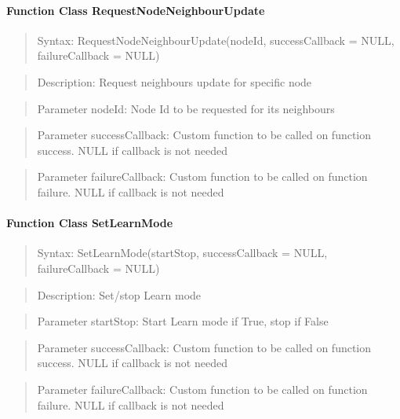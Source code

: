 \paragraph {Function Class RequestNodeNeighbourUpdate}
\begin{quote} Syntax: RequestNodeNeighbourUpdate(nodeId, successCallback = NULL, failureCallback = NULL)\end{quote}
\begin{quote} Description: Request neighbours update for specific node\end{quote}
\begin{quote} Parameter nodeId: Node Id to be requested for its neighbours\end{quote}
\begin{quote} Parameter successCallback: Custom function to be called on function success. NULL if callback is not needed\end{quote} 
\begin{quote} Parameter failureCallback: Custom function to be called on function failure. NULL if callback is not needed\end{quote} 

\paragraph {Function Class SetLearnMode}
\begin{quote} Syntax: SetLearnMode(startStop, successCallback = NULL, failureCallback = NULL)\end{quote}
\begin{quote} Description: Set/stop Learn mode\end{quote}
\begin{quote} Parameter startStop: Start Learn mode if True, stop if False\end{quote}
\begin{quote} Parameter successCallback: Custom function to be called on function success. NULL if callback is not needed\end{quote} 
\begin{quote} Parameter failureCallback: Custom function to be called on function failure. NULL if callback is not needed\end{quote} 


